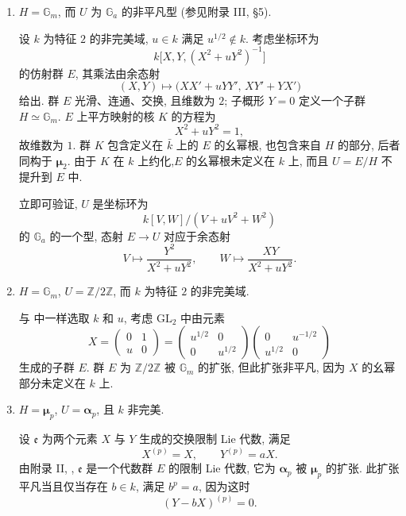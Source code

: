 \begin{enumerate}
\item[(a)] 
\(H=\mathbb G_m\), 而 \(U\) 为 \(\mathbb G_a\) 的非平凡型 (参见附录 III, \S5).

设 \(k\) 为特征 \(2\) 的非完美域, \(u\in k\) 满足 \(u^{1/2}\notin k\).
考虑坐标环为
  \[
    k\bigl[X,Y,(X^2+uY^2)^{-1}\bigr]
  \]
的仿射群 \(E\), 其乘法由余态射
  \[
    (X,Y)\longmapsto
      \bigl(XX'+uYY',\,XY'+YX'\bigr)
  \]
给出. 群 \(E\) 光滑、连通、交换, 且维数为 \(2\);
子概形 \(Y=0\) 定义一个子群 \(H\simeq\mathbb G_m\).
\(E\) 上平方映射的核 \(K\) 的方程为
  \[
    X^2+uY^2=1,
  \]
故维数为 \(1\).
群 \(K\) 包含定义在 \(\bar k\) 上的 \(E\) 的幺幂根,
也包含来自 \(H\) 的部分, 后者同构于 \(\boldsymbol\mu_2\).
由于 \(K\) 在 \(k\) 上约化,\(E\) 的幺幂根未定义在 \(k\) 上,
而且 \(U=E/H\) 不提升到 \(E\) 中.

立即可验证, \(U\) 是坐标环为
  \[
    k[V,W]/(V+uV^2+W^2)
  \]
的 \(\mathbb G_a\) 的一个型, 态射 \(E\longrightarrow U\) 对应于余态射
  \[
    V\longmapsto\frac{Y^2}{X^2+uY^2},
    \qquad
    W\longmapsto\frac{XY}{X^2+uY^2}.
  \]

\item[(b)] 
\(H=\mathbb G_m\), \(U=\mathbb Z/2\mathbb Z\),
而 \(k\) 为特征 \(2\) 的非完美域.

与 中一样选取 \(k\) 和 \(u\),
考虑 \(\mathrm{GL}_2\) 中由元素
  \[
    X=
    \begin{pmatrix}0&1\\u&0\end{pmatrix}
    =
    \begin{pmatrix}u^{1/2}&0\\0&u^{1/2}\end{pmatrix}
    \begin{pmatrix}0&u^{-1/2}\\u^{1/2}&0\end{pmatrix}
  \]
生成的子群 \(E\).
群 \(E\) 为 \(\mathbb Z/2\mathbb Z\) 被 \(\mathbb G_m\) 的扩张,
但此扩张非平凡, 因为 \(X\) 的幺幂部分未定义在 \(k\) 上.

\item[(c)] 
\(H=\boldsymbol\mu_p\), \(U=\boldsymbol\alpha_p\), 且 \(k\) 非完美.

设 \(\mathfrak e\) 为两个元素 \(X\) 与 \(Y\) 生成的交换限制 Lie 代数, 满足
  \[
    X^{(p)}=X,\qquad Y^{(p)}=aX.
  \]
由附录 II, ,
\(\mathfrak e\) 是一个代数群 \(E\) 的限制 Lie 代数,
它为 \(\boldsymbol\alpha_p\) 被 \(\boldsymbol\mu_p\) 的扩张.
此扩张平凡当且仅当存在 \(b\in k\), 满足 \(b^p=a\), 因为这时
  \[
    (Y-bX)^{(p)}=0.
  \]


\end{enumerate}
